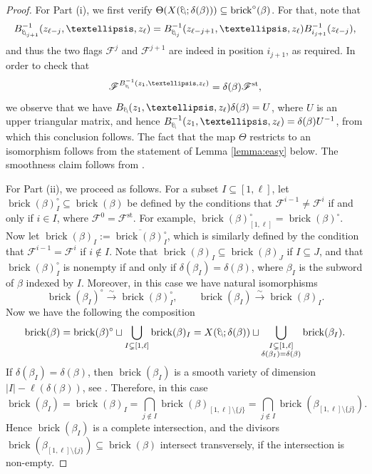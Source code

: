 \documentclass[10pt]{amsart}
\theoremstyle{plain}
\theoremstyle{definition}
\theoremstyle{remark}
\numberwithin{equation}{section}
\newcommand{\sse}{\subseteq}
\newcommand{\std}{\text{st}}
\newcommand{\cF}{\mathscr{F}}
\newcommand{\brick}{\operatorname{brick}}
\DeclareRobustCommand{\ateb}{\text{\reflectbox{$\beta$}}}
\begin{document}
\begin{proof}
For Part (i), we first verify $\Theta(X(\ateb; \delta(\beta)))\sse\brick^{\circ}(\beta)$. For that, note that $$B_{\ateb_{j+1}}^{-1}(z_{\ell - j}, \dots, z_{\ell}) = B_{\ateb_{j}}^{-1}(z_{\ell - j + 1}, \dots, z_{\ell})B_{i_{j+1}}^{-1}(z_{\ell-j}),$$
and thus the two flags $\cF^{j}$ and $\cF^{j+1}$ are indeed in position $i_{j+1}$, as required. In order to check that
$$\cF^{B^{-1}_{\ateb}(z_1, \dots, z_{\ell})} = \delta(\beta)\cF^{\std},$$
we observe that we have $B_{\ateb}(z_1, \dots, z_{\ell})\delta(\beta) = U$, where $U$ is an upper triangular matrix, and hence $B^{-1}_{\ateb}(z_1, \dots, z_{\ell}) = \delta(\beta)U^{-1}$, from which this conclusion follows. The fact that the map $\Theta$ restricts to an isomorphism follows from the statement of Lemma \ref{lemma:easy} below. The smoothness claim follows from \cite[Theorem 3.3]{Escobar}.

\noindent For Part (ii), we proceed as follows. For a subset $I \subseteq [1, \ell]$, let $\brick(\beta)^{\circ}_{I} \subseteq \brick(\beta)$ be defined by the conditions that $\cF^{i-1} \neq \cF^{i}$ if and only if $i \in I$, where $\cF^{0} = \cF^{\std}$. For example, $\brick(\beta)^{\circ}_{[1, \ell]} = \brick(\beta)^{\circ}$. Now let $\brick(\beta)_{I} := \overline{\brick(\beta)_{I}^{\circ}}$, which is similarly defined by the condition that $\cF^{i-1} = \cF^{i}$ if $i \not\in I$. Note that $\brick(\beta)_{I} \subseteq \brick(\beta)_{J}$ if $I \subseteq J$, and that $\brick(\beta)_{I}^{\circ}$ is nonempty if and only if $\delta(\beta_{I}) = \delta(\beta)$, where $\beta_{I}$ is the subword of $\beta$ indexed by $I$. Moreover, in this case we have natural isomorphisms $$\brick(\beta_{I})^{\circ} \overset\sim\rightarrow \brick(\beta)_{I}^{\circ}, \qquad \brick(\beta_{I}) \overset\sim\rightarrow \brick(\beta)_{I}.$$
Now we have the following the composition
$$
\brick(\beta) = \brick(\beta)^{\circ} \sqcup \bigcup_{I \subsetneq [1,\ell]}\brick(\beta)_{I} = X(\ateb; \delta(\beta))\sqcup\bigcup_{\substack{I \subsetneq [1, \ell] \\ \delta(\beta_{I}) = \delta(\beta)}}\brick(\beta_{I}).
$$
If $\delta(\beta_{I}) = \delta(\beta)$, then $\brick(\beta_{I})$ is a smooth variety of dimension $|I| - \ell(\delta(\beta))$, see \cite[Theorem 3.3]{Escobar}. Therefore, in this case $$\brick(\beta_{I}) = \brick(\beta)_{I} = \bigcap_{j \not\in I}\brick(\beta)_{[1,\ell]\setminus\{j\}} = \bigcap_{j \not\in I}\brick(\beta_{[1,\ell]\setminus\{j\}}).$$
Hence $\brick(\beta_{I})$ is a complete intersection, and the divisors $\brick(\beta_{[1,\ell]\setminus\{j\}}) \subseteq \brick(\beta)$ intersect transversely, if the intersection is non-empty.
\end{proof}
\end{document}
